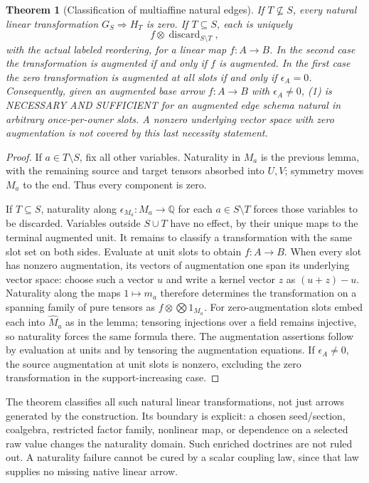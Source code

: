 \documentclass[11pt]{article}
\newtheorem{theorem}{Theorem}\newtheorem{proposition}{Proposition}\newtheorem{lemma}{Lemma}
\begin{document}
\begin{theorem}[Classification of multiaffine natural edges]
If $T\nsubseteq S$, every natural linear transformation $G_S\Rightarrow H_T$ is zero. If $T\subseteq S$, each is uniquely
\[
 f\otimes\operatorname{discard}_{S\setminus T},\tag{3}
\]
with the actual labeled reordering, for a linear map $f:A\to B$. In the second case the transformation is augmented if and only if $f$ is augmented. In the first case the zero transformation is augmented at all slots if and only if $\epsilon_A=0$. Consequently, given an augmented base arrow $f:A\to B$ with $\epsilon_A\ne0$, (1) is NECESSARY AND SUFFICIENT for an augmented edge schema natural in arbitrary once-per-owner slots. A nonzero underlying vector space with zero augmentation is not covered by this last necessity statement.
\end{theorem}
\begin{proof}
If $a\in T\setminus S$, fix all other variables. Naturality in $M_a$ is the previous lemma, with the remaining source and target tensors absorbed into $U,V$; symmetry moves $M_a$ to the end. Thus every component is zero.

If $T\subseteq S$, naturality along $\epsilon_{M_a}:M_a\to\mathbb Q$ for each $a\in S\setminus T$ forces those variables to be discarded. Variables outside $S\cup T$ have no effect, by their unique maps to the terminal augmented unit. It remains to classify a transformation with the same slot set on both sides. Evaluate at unit slots to obtain $f:A\to B$. When every slot has nonzero augmentation, its vectors of augmentation one span its underlying vector space: choose such a vector $u$ and write a kernel vector $z$ as $(u+z)-u$. Naturality along the maps $1\mapsto m_a$ therefore determines the transformation on a spanning family of pure tensors as $f\otimes\bigotimes1_{M_a}$. For zero-augmentation slots embed each into $\widehat M_a$ as in the lemma; tensoring injections over a field remains injective, so naturality forces the same formula there. The augmentation assertions follow by evaluation at units and by tensoring the augmentation equations. If $\epsilon_A\ne0$, the source augmentation at unit slots is nonzero, excluding the zero transformation in the support-increasing case.
\end{proof}

The theorem classifies all such natural linear transformations, not just arrows generated by the construction. Its boundary is explicit: a chosen seed/section, coalgebra, restricted factor family, nonlinear map, or dependence on a selected raw value changes the naturality domain. Such enriched doctrines are not ruled out. A naturality failure cannot be cured by a scalar coupling law, since that law supplies no missing native linear arrow.
\end{document}
